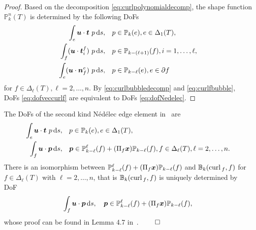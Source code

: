 \documentclass[mathpazo]{cicp}
\begin{document}
\begin{proof}
%
Based on the decomposition \eqref{eq:curlpolynomialdecomp}, the shape function $\mathbb P_k^n(T)$ is determined by the following DoFs
\begin{subequations}
\label{eq:dofveccurlf}
\begin{align}
\label{eq:dofvectortedgecurlf}
\int_e \boldsymbol u\cdot \boldsymbol t\ p \,{\rm d} s,& \quad p\in \mathbb P_{k} (e), e\in\Delta_1(T),\\
\label{eq:dofvectortcurlf}
\int_f (\boldsymbol u\cdot \boldsymbol t_i^f)\ p \,{\rm d} s,& \quad p\in \mathbb P_{k - (\ell +1)} (f), i=1,\ldots, \ell, \\
\label{eq:dofvectorncurlf}
\int_e (\boldsymbol u\cdot \boldsymbol n_{f}^e)\ p \,{\rm d} s, &\quad p\in \mathbb P_{k - \ell} (e), e\in\partial f 
\end{align}
\end{subequations}
for $f\in \Delta_{\ell}(T), \ell = 2,\ldots, n$.
By \eqref{eq:curlbubbledecomp} and \eqref{eq:curlfbubble},  DoFs \eqref{eq:dofveccurlf} are equivalent to DoFs \eqref{eq:dofNedelec}.
\end{proof}



\begin{remark}\rm
 The DoFs of the second kind N\'ed\'elec edge element in~\cite{Nedelec1986,ArnoldFalkWinther2006} are
\begin{align*}
\int_e \boldsymbol u\cdot \boldsymbol t\ p \,{\rm d} s,& \quad p\in \mathbb P_{k} (e), e\in \Delta_1(T), \\
\int_f \boldsymbol u\cdot \boldsymbol p \,{\rm d} s,& \quad \boldsymbol p\in \mathbb P_{k-\ell}^{\ell}(f)+(\Pi_f\boldsymbol x)\mathbb P_{k-\ell}(f), f\in\Delta_{\ell}(T), \ell=2,\ldots, n. 
\end{align*} 
There is an isomorphism between $\mathbb P_{k-\ell}^{\ell}(f)+(\Pi_f\boldsymbol x)\mathbb P_{k-\ell}(f)$ and $\mathbb B_k({\rm curl\,}_f, f)$ for $f\in\Delta_{\ell}(T)$ with $\ell=2, \ldots, n$, that is $\mathbb B_k({\rm curl\,}_f, f)$ is uniquely determined by DoF 
\begin{equation*}
\int_f \boldsymbol u\cdot \boldsymbol p \,{\rm d} s, \quad \boldsymbol p\in \mathbb P_{k-\ell}^{\ell}(f)+(\Pi_f\boldsymbol x)\mathbb P_{k-\ell}(f),
\end{equation*}
whose proof can be found in Lemma 4.7 in~\cite{ArnoldFalkWinther2006}.
$\qed$
\end{remark}
\end{document}

